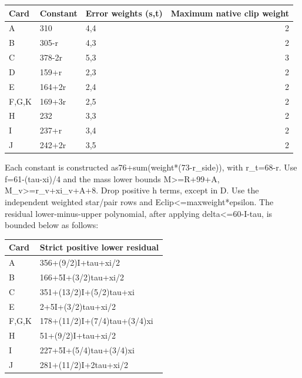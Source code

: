 \documentclass[10pt,a4paper]{article}
\theoremstyle{definition}
\begin{document}
\begin{longtable}[]{@{}lllr@{}}
\toprule\noalign{}
Card & Constant & Error weights (s,\allowbreak{}t) & Maximum native clip weight \\
\midrule\noalign{}
\endhead
\bottomrule\noalign{}
\endlastfoot
A & 310 & 4,\allowbreak{}4 & 2 \\
B & 305-r & 4,\allowbreak{}3 & 2 \\
C & 378-2r & 5,\allowbreak{}3 & 3 \\
D & 159+\allowbreak{}r & 2,\allowbreak{}3 & 2 \\
E & 164+\allowbreak{}2r & 2,\allowbreak{}4 & 2 \\
F,\allowbreak{}G,\allowbreak{}K & 169+\allowbreak{}3r & 2,\allowbreak{}5 & 2 \\
H & 232 & 3,\allowbreak{}3 & 2 \\
I & 237+\allowbreak{}r & 3,\allowbreak{}4 & 2 \\
J & 242+\allowbreak{}2r & 3,\allowbreak{}5 & 2 \\
\end{longtable}

Each constant is constructed as76+\allowbreak{}sum(weight*(73-r\_\allowbreak{}side)),\allowbreak{} with
r\_\allowbreak{}t=\allowbreak{}68-r. Use f=\allowbreak{}61-(tau-xi)/4 and the mass lower bounds
M\textgreater=\allowbreak{}R+\allowbreak{}99+\allowbreak{}A,\allowbreak{} M\_\allowbreak{}v\textgreater=\allowbreak{}r\_\allowbreak{}v+\allowbreak{}xi\_\allowbreak{}v+\allowbreak{}A+\allowbreak{}8. Drop positive h
terms,\allowbreak{} except in D. Use the independent weighted star/pair rows and
Eclip\textless=\allowbreak{}maxweight*epsilon. The residual lower-minus-upper
polynomial,\allowbreak{} after applying delta\textless=\allowbreak{}60-I-tau,\allowbreak{} is bounded below as
follows:

\begin{longtable}[]{@{}ll@{}}
\toprule\noalign{}
Card & Strict positive lower residual \\
\midrule\noalign{}
\endhead
\bottomrule\noalign{}
\endlastfoot
A & 356+\allowbreak{}(9/2)I+\allowbreak{}tau+\allowbreak{}xi/2 \\
B & 166+\allowbreak{}5I+\allowbreak{}(3/2)tau+\allowbreak{}xi/2 \\
C & 351+\allowbreak{}(13/2)I+\allowbreak{}(5/2)tau+\allowbreak{}xi \\
E & 2+\allowbreak{}5I+\allowbreak{}(3/2)tau+\allowbreak{}xi/2 \\
F,\allowbreak{}G,\allowbreak{}K & 178+\allowbreak{}(11/2)I+\allowbreak{}(7/4)tau+\allowbreak{}(3/4)xi \\
H & 51+\allowbreak{}(9/2)I+\allowbreak{}tau+\allowbreak{}xi/2 \\
I & 227+\allowbreak{}5I+\allowbreak{}(5/4)tau+\allowbreak{}(3/4)xi \\
J & 281+\allowbreak{}(11/2)I+\allowbreak{}2tau+\allowbreak{}xi/2 \\
\end{longtable}
\end{document}
